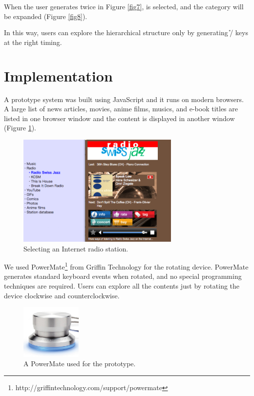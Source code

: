 \documentclass{article}
\begin{document}
When the user generates {\D} twice in Figure \ref{fig7},
 is selected, and the category will be expanded (Figure \ref{fig8}).

In this way, users can explore the hierarchical structure
only by generating {\U}/{\D} keys at the right timing.

\section*{Implementation}

A prototype system was built using JavaScript and it runs on modern browsers.
A large list of news articles, movies, anime films, musics, and e-book titles are listed in one browser window
and the content is displayed in another window (Figure \ref{screenshot}).

\begin{figure}[H]
\centerline{\includegraphics[width=80mm,bb=0 0 671 464]{figures/95cf2fec71c52ead6fdbcb7f79aca654.png}}
\caption{Selecting an Internet radio station.}
\label{screenshot}
\end{figure}

We used
PowerMate\footnote{
  \textsf{http://griffintechnology.com/support/powermate}
} from Griffin Technology for the rotating device.
PowerMate generates standard keyboard events when rotated,
and no special programming techniques are required.
%
Users can explore all the contents just by
rotating the device clockwise and counterclockwise.

\begin{figure}[H]
\centerline{\includegraphics[width=30mm,bb=0 0 389 348]{figures/d3a69499f7e7314ae6dc10f5bf3a2be5.png}}
\caption{A PowerMate used for the prototype.}
\label{powermate}
\end{figure}
\end{document}
